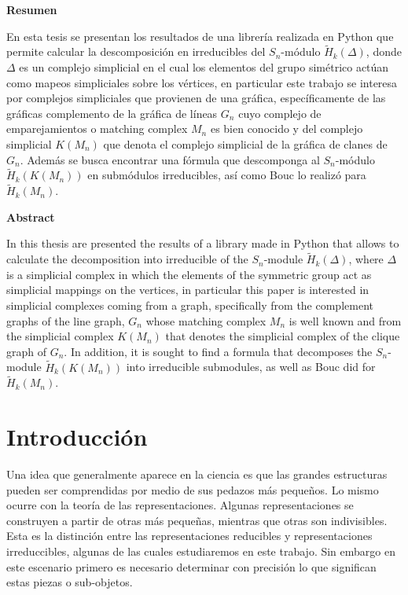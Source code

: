 \documentclass[12pt]{book}
\theoremstyle{definition}
\newcounter{in}
\begin{document}
\begin{flushleft}
  {\bfseries\Large Resumen}
\end{flushleft}

En esta tesis se presentan los resultados de una librería realizada en
Python que permite calcular la descomposición en irreducibles del
$S_n$-módulo $\widetilde H_{k}(\Delta)$, donde $\Delta$ es un complejo
simplicial en el cual los elementos del grupo simétrico actúan 
como mapeos simpliciales sobre los vértices, en particular este 
trabajo se interesa por complejos simpliciales que provienen de una gráfica,
específicamente de las gráficas complemento de la gráfica de líneas $G_n$ 
cuyo complejo de emparejamientos o matching complex $M_n$ es bien conocido 
y del complejo simplicial $K(M_n)$ que denota el complejo simplicial de la gráfica de clanes de $G_n$. Además se busca encontrar una fórmula que descomponga al $S_n$-módulo
$\widetilde H_{k}(K(M_n))$ en submódulos irreducibles, así como Bouc
\cite{MR756517} lo realizó para $\widetilde H_{k}(M_n)$.

\vspace{2cm}

\begin{flushleft}
  {\bfseries\Large Abstract}
\end{flushleft}

In this thesis are presented the results of a library made in Python
that allows to calculate the decomposition into irreducible of the
$S_n$-module $\widetilde H_{k}(\Delta)$, where $\Delta$ is a simplicial 
complex in which the elements of the symmetric group act as simplicial 
mappings on the vertices, in particular this paper is interested in simplicial 
complexes coming from a graph, specifically from the complement graphs of the line graph,
$G_n$ whose matching complex $M_n$ is well known and from the
simplicial complex $K(M_n)$ that denotes the simplicial complex of the
clique graph of $G_n$. In addition, it is sought to find a formula
that decomposes the $S_n$-module $\widetilde H_{k}(K(M_n))$ into
irreducible submodules, as well as Bouc \cite{MR756517} did for
$\widetilde H_{k}(M_n)$.

 \newpage \thispagestyle{empty}
 
 \chapter*{Introducción}

 Una idea que generalmente aparece en la ciencia es que las grandes
 estructuras pueden ser comprendidas por medio de sus pedazos más
 pequeños. Lo mismo ocurre con la teoría de las
 representaciones. Algunas representaciones se construyen a partir de
 otras más pequeñas, mientras que otras son indivisibles. Esta es la
 distinción entre las representaciones reducibles y representaciones
 irreduccibles, algunas de las cuales estudiaremos en este
 trabajo. Sin embargo en este escenario primero es necesario
 determinar con precisión lo que significan estas piezas o
 sub-objetos.
\end{document}

